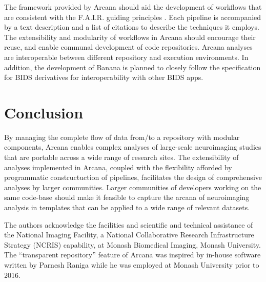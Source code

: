 \documentclass[smallextended]{svjour3}       %
\begin{document}
The framework provided by Arcana should aid the development of workflows
that are consistent with the F.A.I.R. guiding principles \citep{wilkinson_fair_2016}.
Each pipeline is accompanied by a text description and
a list of citations to describe the techniques it employs.
The extensibility and modularity of workflows in Arcana should encourage
their reuse, and enable communal development of code repositories.
Arcana analyses are interoperable between different
repository and execution environments. In addition, the development of
Banana is planned to closely follow the specification for BIDS
derivatives \citep{gorgolewski_bids_nodate} for interoperability with
other BIDS apps.

\section*{Conclusion}
\label{conclusion}

By managing the complete flow of data from/to a repository with modular
components, Arcana enables complex analyses of large-scale neuroimaging
studies that are portable across a wide range of research sites. The
extensibility of analyses implemented in Arcana, coupled with the
flexibility afforded by programmatic constructuction of pipelines,
facilitates the design of comprehensive analyses by larger communities.
Larger communities of developers working on the same code-base should
make it feasible to capture the arcana of neuroimaging analysis in
templates that can be applied to a wide range of relevant datasets.

\begin{acknowledgements}
The authors acknowledge the facilities and scientific and technical assistance
of the National Imaging Facility, a National Collaborative Research
Infrastructure Strategy (NCRIS) capability, at Monash Biomedical Imaging,
Monash University. The ``transparent repository'' feature of Arcana was
inspired by in-house software written by Parnesh Raniga while he was
employed at Monash University prior to 2016.
\end{acknowledgements}

 

\end{document}
